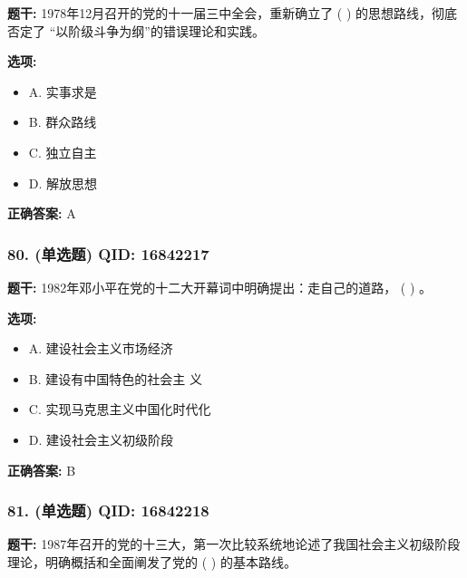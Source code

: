 \documentclass[12pt,UTF8]{ctexart}
\begin{document}
\textbf{题干:}
1978年12月召开的党的十一届三中全会，重新确立了 ( ) 的思想路线，彻底否定了 “以阶级斗争为纲”的错误理论和实践。

\textbf{选项:}
\begin{itemize}[leftmargin=*]

  \item A. 实事求是

  \item B. 群众路线

  \item C. 独立自主

  \item D. 解放思想

\end{itemize}

\textbf{正确答案:}
A

\vspace{0.3em}\hrulefill\vspace{0.7em}

\subsubsection*{80. (单选题) \small QID: 16842217}

\textbf{题干:}
1982年邓小平在党的十二大开幕词中明确提出：走自己的道路， ( ) 。

\textbf{选项:}
\begin{itemize}[leftmargin=*]

  \item A. 建设社会主义市场经济

  \item B. 建设有中国特色的社会主 义

  \item C. 实现马克思主义中国化时代化

  \item D. 建设社会主义初级阶段

\end{itemize}

\textbf{正确答案:}
B

\vspace{0.3em}\hrulefill\vspace{0.7em}

\subsubsection*{81. (单选题) \small QID: 16842218}

\textbf{题干:}
1987年召开的党的十三大，第一次比较系统地论述了我国社会主义初级阶段理论，明确概括和全面阐发了党的 ( ) 的基本路线。
\end{document}
